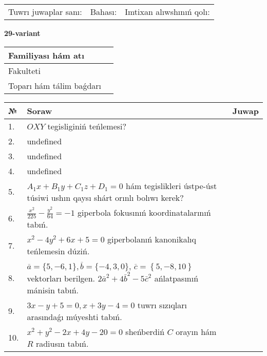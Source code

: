 \documentclass{article}
\begin{document}
\vspace{0.7cm}

\begin{tabular}{lll}
Tuwrı juwaplar sanı: \underline{\hspace{1cm}} & 
Bahası: \underline{\hspace{1cm}} & 
Imtixan alıwshınıń qolı: \underline{\hspace{2cm}} \\
\end{tabular}

\egroup

\newpage


\textbf{29-variant}\\

\bgroup
\def\arraystretch{1.6} %

\begin{tabular}{|m{5.7cm}|m{9.5cm}|}
\hline
Familiyası hám atı & \\
\hline
Fakulteti  & \\
\hline
Toparı hám tálim baǵdarı  & \\
\hline
\end{tabular}

\vspace{0.7cm}

\begin{tabular}{|m{0.7cm}|m{10cm}|m{4cm}|}
\hline
№ & Soraw & Juwap \\
\hline
1. & \(OXY\) tegisliginiń teńlemesi? &  \\
\hline
2. & undefined &  \\
\hline
3. & undefined &  \\
\hline
4. & undefined &  \\
\hline
5. & \(A_{1}x + B_{1}y + C_{1}z + D_{1} = 0\) hám tegislikleri ústpe-úst túsiwi ushın qaysı shárt orınlı bolıwı kerek? &  \\
\hline
6. & \(\frac{x^{2}}{225} - \frac{y^{2}}{64} = - 1\) giperbola fokusınıń koordinatalarınıń tabıń. &  \\
\hline
7. & \(x^{2} - 4 y^{2} + 6 x + 5 = 0\) giperbolanıń kanonikalıq teńlemesin dúziń. &  \\
\hline
8. & \(\overline{a} = \{5,- 6, 1 \}, \overline{b} = \{ - 4, 3, 0 \} \), \(\overline{c} = \left\{ 5,- 8, 10 \right\}\) vektorları berilgen. \(2{\bar{a}}^{2} + 4{\bar{b}}^{2} - 5{\bar{c}}^{2}\) ańlatpasınıń mánisin tabıń. &  \\
\hline
9. & \(3 x - y + 5 = 0, x + 3 y - 4 = 0\) tuwrı sızıqları arasındaǵı múyeshti tabıń. &  \\
\hline
10. & \(x^{2} + y^{2} - 2 x + 4 y - 20 = 0\) sheńberdiń \(C\) orayın hám \(R\) radiusın tabıń. & \\
\hline
\end{tabular}
\end{document}
